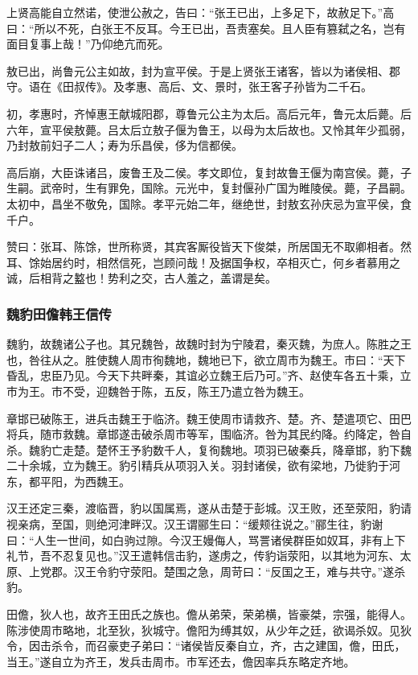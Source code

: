 \documentclass[]{article}
\begin{document}
上贤高能自立然诺，使泄公赦之，告曰：``张王已出，上多足下，故赦足下。''高曰：``所以不死，白张王不反耳。今王已出，吾责塞矣。且人臣有篡弑之名，岂有面目复事上哉！''乃仰绝亢而死。

敖已出，尚鲁元公主如故，封为宣平侯。于是上贤张王诸客，皆以为诸侯相、郡守。语在《田叔传》。及孝惠、高后、文、景时，张王客子孙皆为二千石。

初，孝惠时，齐悼惠王献城阳郡，尊鲁元公主为太后。高后元年，鲁元太后薨。后六年，宣平侯敖薨。吕太后立敖子偃为鲁王，以母为太后故也。又怜其年少孤弱，乃封敖前妇子二人；寿为乐昌侯，侈为信都侯。

高后崩，大臣诛诸吕，废鲁王及二侯。孝文即位，复封故鲁王偃为南宫侯。薨，子生嗣。武帝时，生有罪免，国除。元光中，复封偃孙广国为睢陵侯。薨，子昌嗣。太初中，昌坐不敬免，国除。孝平元始二年，继绝世，封敖玄孙庆忌为宣平侯，食千户。

赞曰：张耳、陈馀，世所称贤，其宾客厮役皆天下俊桀，所居国无不取卿相者。然耳、馀始居约时，相然信死，岂顾问哉！及据国争权，卒相灭亡，何乡者慕用之诚，后相背之盭也！势利之交，古人羞之，盖谓是矣。

\hypertarget{header-n3498}{%
\subsubsection{魏豹田儋韩王信传}\label{header-n3498}}

魏豹，故魏诸公子也。其兄魏咎，故魏时封为宁陵君，秦灭魏，为庶人。陈胜之王也，咎往从之。胜使魏人周市徇魏地，魏地已下，欲立周市为魏王。市曰：``天下昏乱，忠臣乃见。今天下共畔秦，其谊必立魏王后乃可。''齐、赵使车各五十乘，立市为王。市不受，迎魏咎于陈，五反，陈王乃遣立咎为魏王。

章邯已破陈王，进兵击魏王于临济。魏王使周市请救齐、楚。齐、楚遣项它、田巴将兵，随市救魏。章邯遂击破杀周市等军，围临济。咎为其民约降。约降定，咎自杀。魏豹亡走楚。楚怀王予豹数千人，复徇魏地。项羽已破秦兵，降章邯，豹下魏二十余城，立为魏王。豹引精兵从项羽入关。羽封诸侯，欲有梁地，乃徙豹于河东，都平阳，为西魏王。

汉王还定三秦，渡临晋，豹以国属焉，遂从击楚于彭城。汉王败，还至荥阳，豹请视亲病，至国，则绝河津畔汉。汉王谓郦生曰：``缓颊往说之。''郦生往，豹谢曰：``人生一世间，如白驹过隙。今汉王嫚侮人，骂詈诸侯群臣如奴耳，非有上下礼节，吾不忍复见也。''汉王遣韩信击豹，遂虏之，传豹诣荥阳，以其地为河东、太原、上党郡。汉王令豹守荥阳。楚围之急，周苛曰：``反国之王，难与共守。''遂杀豹。

田儋，狄人也，故齐王田氏之族也。儋从弟荣，荣弟横，皆豪桀，宗强，能得人。陈涉使周市略地，北至狄，狄城守。儋阳为缚其奴，从少年之廷，欲谒杀奴。见狄令，因击杀令，而召豪吏子弟曰：``诸侯皆反秦自立，齐，古之建国，儋，田氏，当王。''遂自立为齐王，发兵击周市。市军还去，儋因率兵东略定齐地。
\end{document}
